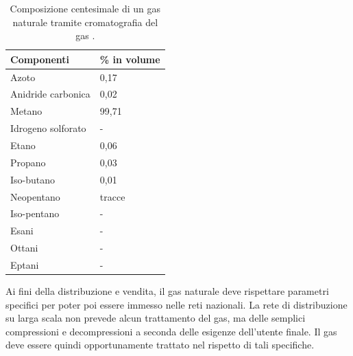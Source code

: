 \begin{table}[htbp]
    \small
    \centering
    \caption{Composizione centesimale di un gas naturale tramite cromatografia del gas \parencite{mele2012produzione}.}
    \label{tab:ng-composition}
    \begin{tabular}{p{}p{}}
        \hline
        {\bf Componenti}                & {\textbf{\% in volume}}       \\ \hline
        Azoto                           & {0,17}                        \\
        Anidride carbonica              & {0,02}                        \\
        Metano                          & {99,71}                       \\
        Idrogeno solforato              & {-}                           \\
        Etano                           & {0,06}                        \\
        Propano                         & {0,03}                        \\
        Iso-butano                      & {0,01}                        \\
        Neopentano                      & tracce                        \\
        Iso-pentano                     & -                             \\
        Esani                           & -                             \\
        Ottani                          & -                             \\
        Eptani                          & -                             \\ \hline
    \end{tabular}
\end{table}

Ai fini della distribuzione e vendita, il gas naturale deve rispettare parametri specifici per poter poi essere immesso nelle reti nazionali. La rete di distribuzione su larga scala non prevede alcun trattamento del gas, ma delle semplici compressioni e decompressioni a seconda delle esigenze dell'utente finale. Il gas deve essere quindi opportunamente trattato nel rispetto di tali specifiche.

